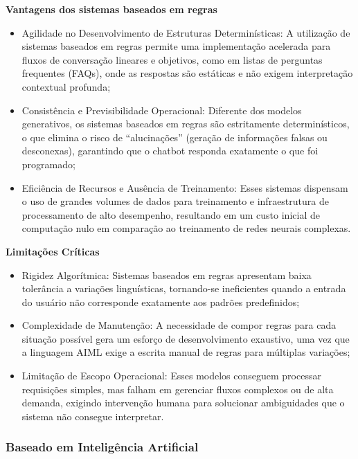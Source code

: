 \documentclass[12pt,a4paper]{extarticle}
\begin{document}
\textbf{Vantagens dos sistemas baseados em regras}
\begin{itemize}
    \item Agilidade no Desenvolvimento de Estruturas Determinísticas: A utilização de sistemas baseados em regras permite uma implementação acelerada para fluxos de conversação lineares e objetivos, como em listas de perguntas frequentes (FAQs), onde as respostas são estáticas e não exigem interpretação contextual profunda;
    \item Consistência e Previsibilidade Operacional: Diferente dos modelos generativos, os sistemas baseados em regras são estritamente determinísticos, o que elimina o risco de ``alucinações'' (geração de informações falsas ou desconexas), garantindo que o chatbot responda exatamente o que foi programado;
    \item Eficiência de Recursos e Ausência de Treinamento: Esses sistemas dispensam o uso de grandes volumes de dados para treinamento e infraestrutura de processamento de alto desempenho, resultando em um custo inicial de computação nulo em comparação ao treinamento de redes neurais complexas.
\end{itemize}

\textbf{Limitações Críticas}
\begin{itemize}
    \item Rigidez Algorítmica: Sistemas baseados em regras apresentam baixa tolerância a variações linguísticas, tornando-se ineficientes quando a entrada do usuário não corresponde exatamente aos padrões predefinidos;
    \item Complexidade de Manutenção: A necessidade de compor regras para cada situação possível gera um esforço de desenvolvimento exaustivo, uma vez que a linguagem AIML exige a escrita manual de regras para múltiplas variações;
    \item Limitação de Escopo Operacional: Esses modelos conseguem processar requisições simples, mas falham em gerenciar fluxos complexos ou de alta demanda, exigindo intervenção humana para solucionar ambiguidades que o sistema não consegue interpretar.
\end{itemize}

\subsubsection{Baseado em Inteligência Artificial}
\label{sec:ia}
\end{document}
